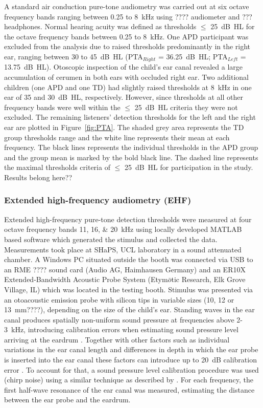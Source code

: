 \documentclass[a4paper, twoside]{templates/ociamthesis}
\begin{document}
A standard air conduction pure-tone audiometry was carried out at six octave frequency bands ranging between 0.25 to 8~kHz using ???? audiometer and ??? headphones. Normal hearing acuity was defined as thresholds \(\leq\) 25~dB~HL for the octave frequency bands between 0.25 to 8~kHz. One APD participant was excluded from the analysis due to raised thresholds predominantly in the right ear, ranging between 30 to 45~dB~HL (PTA\(_{Right}\) = 36.25~dB~HL; PTA\(_{Left}\) = 13.75~dB~HL). Otoscopic inspection of the child's ear canal revealed a large accumulation of cerumen in both ears with occluded right ear. Two additional children (one APD and one TD) had slightly raised thresholds at 8~kHz in one ear of 35 and 30~dB~HL, respectively. However, since thresholds at all other frequency bands were well within the \(\leq\) 25~dB~HL criteria they were not excluded. The remaining listeners' detection thresholds for the left and the right ear are plotted in Figure~\ref{fig:PTA}. The shaded grey area represents the TD group thresholds range and the white line represents their mean at each frequency. The black lines represents the individual thresholds in the APD group and the group mean is marked by the bold black line. The dashed line represents the maximal thresholds criteria of \(\leq\) 25~dB~HL for participation in the study. \colorbox[HTML]{CCCCFF}{Results belong here??}

\hypertarget{extended-high-frequency-audiometry-ehf}{%
\subsubsection{Extended high-frequency audiometry (EHF)}\label{extended-high-frequency-audiometry-ehf}}

Extended high-frequency pure-tone detection thresholds were measured at four octave frequency bands 11, 16, \& 20~kHz using locally developed MATLAB based software which generated the stimulus and collected the data. Measurements took place at SHaPS, UCL laboratory in a sound attenuated chamber. A Windows PC situated outside the booth was connected via USB to an RME ???? sound card (Audio AG, Haimhausen Germany) and an ER10X Extended-Bandwidth Acoustic Probe System (Etym\(\bar{o}\)tic Research, Elk Grove Village, IL) which was located in the testing booth. Stimulus was presented via an otoacoustic emission probe with silicon tips in variable sizes (10, 12 or 13~mm????), depending on the size of the child's ear. Standing waves in the ear canal produces spatially non-uniform sound pressure at frequencies above 2-3~kHz, introducing calibration errors when estimating sound pressure level arriving at the eardrum \autocite{Siegel1994,Richmond2011,Lee2012}. Together with other factors such as individual variations in the ear canal length and differences in depth in which the ear probe is inserted into the ear canal these factors can introduce up to 20~dB calibration error \autocite{Siegel1994}. To account for that, a sound pressure level calibration procedure was used (chirp noise) using a similar technique as described by \textcite{Lee2012}. For each frequency, the first half-wave resonance of the ear canal was measured, estimating the distance between the ear probe and the eardrum.
\end{document}
